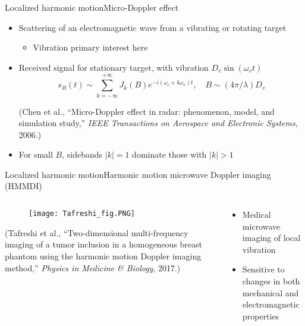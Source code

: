 \documentclass[11pt]{beamer}
\begin{document}
	\begin{frame}{Localized harmonic motion}{Micro-Doppler effect}
		\begin{itemize}
			\pause
			\item Scattering of an electromagnetic wave from a vibrating or rotating target
			\begin{itemize}
				\item Vibration primary interest here
			\end{itemize}
			\pause
			\item Received signal for stationary target, with vibration $D_v \sin(\omega_v t)$
			\begin{equation*}
				s_R(t) \sim \sum_{k=-\infty}^{+\infty} J_k(B) e^{-i(\omega_c +k \omega_v)t}, \quad B \sim (4\pi/\lambda)D_v
			\end{equation*}
			\parbox{\linewidth}{\tiny (Chen et al., “Micro-Doppler effect in radar: phenomenon, model, and simulation study,” \emph{IEEE Transactions on Aerospace and Electronic Systems}, 2006.)}
			\pause
			\item For small $B$, sidebands $|k|=1$ dominate those with $|k|>1$
		\end{itemize}
	\end{frame}
	
	\begin{frame}{Localized harmonic motion}{Harmonic motion microwave Doppler imaging (HMMDI)}
		\begin{columns}
			\begin{column}{0.5\textwidth}
				\begin{figure}
					\centering
					\texttt{[image: Tafreshi\_fig.PNG]}
				\end{figure}
				\parbox{\linewidth}{\tiny (Tafreshi et al., “Two-dimensional multi-frequency imaging of a tumor inclusion in a homogeneous breast phantom using the harmonic motion Doppler imaging method,” \emph{Physics in Medicine \& Biology}, 2017.)}
			\end{column}
			\pause
			\begin{column}{0.5\textwidth}
				\begin{itemize}
					\item Medical microwave imaging of local vibration
					\pause
					\item Sensitive to changes in both mechanical and electromagnetic properties
				\end{itemize}
			\end{column}
		\end{columns}
	\end{frame}
	
\end{document}
